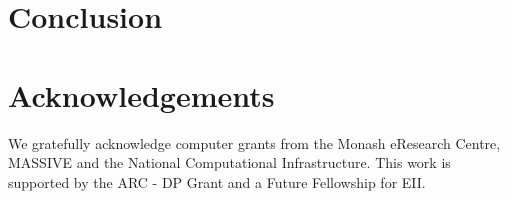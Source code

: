 \documentclass[final]{article}
\begin{document}
\begin{multicols}{2}
\section{Conclusion}


\section*{Acknowledgements}
We gratefully acknowledge computer grants from the Monash eResearch
Centre, MASSIVE and the National Computational Infrastructure. This
work is supported by the ARC - DP Grant and a Future Fellowship for EII.


\renewcommand{\bibfont}{\footnotesize}
\printbibliography

\end{multicols}

\begin{appendices}



\end{appendices}
\end{document}
